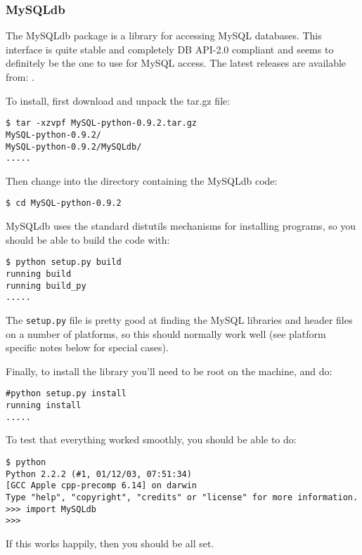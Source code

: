 \documentclass{article}
\begin{document}
\subsubsection{MySQLdb}

The MySQLdb package is a library for accessing MySQL databases.
This interface is quite stable and completely DB API-2.0 compliant and
seems to definitely be the one to use for MySQL access. The latest
releases are available from: 
.


To install, first download and unpack the tar.gz file:

\begin{verbatim}
$ tar -xzvpf MySQL-python-0.9.2.tar.gz 
MySQL-python-0.9.2/
MySQL-python-0.9.2/MySQLdb/
.....
\end{verbatim}

Then change into the directory containing the MySQLdb code:

\begin{verbatim}
$ cd MySQL-python-0.9.2
\end{verbatim}

MySQLdb uses the standard distutils mechanisms for installing programs,
so you should be able to build the code with:

\begin{verbatim}
$ python setup.py build
running build
running build_py
.....
\end{verbatim}

The \verb|setup.py| file is pretty good at finding the MySQL libraries
and header files on a number of platforms, so this should normally work
well (see platform specific notes below for special cases).

Finally, to install the library you'll need to be root on the machine,
and do:

\begin{verbatim}
#python setup.py install
running install
.....
\end{verbatim}

To test that everything worked smoothly, you should be able to do:

\begin{verbatim}
$ python
Python 2.2.2 (#1, 01/12/03, 07:51:34) 
[GCC Apple cpp-precomp 6.14] on darwin
Type "help", "copyright", "credits" or "license" for more information.
>>> import MySQLdb
>>>
\end{verbatim}

If this works happily, then you should be all set.
\\
\end{document}
